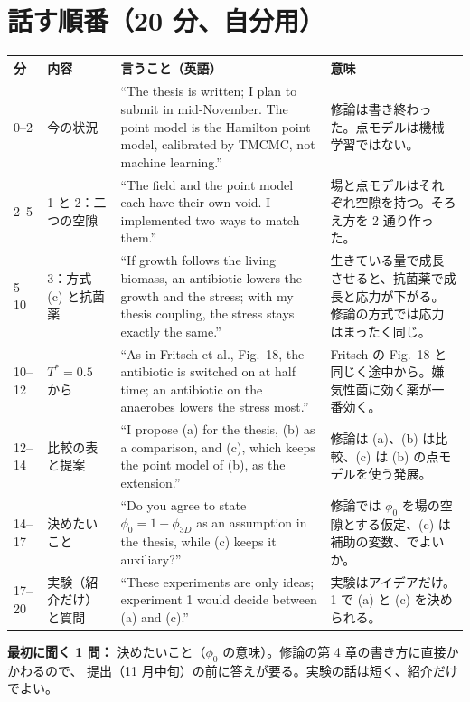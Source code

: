 \documentclass[11pt,a4paper]{article}
\begin{document}
\newpage
\section*{話す順番（20 分、自分用）}
\begin{tabularx}{\linewidth}{@{}l l X X@{}}
\toprule
分 & 内容 & 言うこと（英語） & 意味\\
\midrule
0--2 & 今の状況 & ``The thesis is written; I plan to submit in mid-November. The point model is the Hamilton point model, calibrated by TMCMC, not machine learning.'' & 修論は書き終わった。点モデルは機械学習ではない。\\
2--5 & 1 と 2：二つの空隙 & ``The field and the point model each have their own void. I implemented two ways to match them.'' & 場と点モデルはそれぞれ空隙を持つ。そろえ方を 2 通り作った。\\
5--10 & 3：方式 (c) と抗菌薬 & ``If growth follows the living biomass, an antibiotic lowers the growth and the stress; with my thesis coupling, the stress stays exactly the same.'' & 生きている量で成長させると、抗菌薬で成長と応力が下がる。修論の方式では応力はまったく同じ。\\
10--12 & $T^*=0.5$ から & ``As in Fritsch et al., Fig.~18, the antibiotic is switched on at half time; an antibiotic on the anaerobes lowers the stress most.'' & Fritsch の Fig.~18 と同じく途中から。嫌気性菌に効く薬が一番効く。\\
12--14 & 比較の表と提案 & ``I propose (a) for the thesis, (b) as a comparison, and (c), which keeps the point model of (b), as the extension.'' & 修論は (a)、(b) は比較、(c) は (b) の点モデルを使う発展。\\
14--17 & 決めたいこと & ``Do you agree to state $\phi_0 = 1-\phi_{3D}$ as an assumption in the thesis, while (c) keeps it auxiliary?'' & 修論では $\phi_0$ を場の空隙とする仮定、(c) は補助の変数、でよいか。\\
17--20 & 実験（紹介だけ）と質問 & ``These experiments are only ideas; experiment 1 would decide between (a) and (c).'' & 実験はアイデアだけ。1 で (a) と (c) を決められる。\\
\bottomrule
\end{tabularx}

\vspace{8pt}
\noindent\textbf{最初に聞く 1 問：} 決めたいこと（$\phi_0$ の意味）。修論の第 4 章の書き方に直接かかわるので、
提出（11 月中旬）の前に答えが要る。実験の話は短く、紹介だけでよい。
\end{document}
